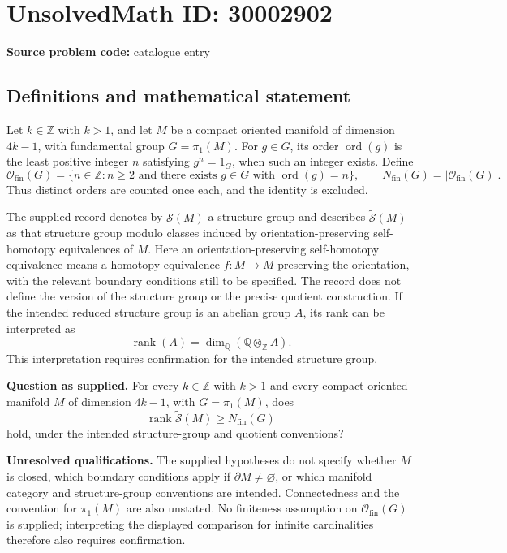\documentclass[11pt]{article}
\newcommand{\Z}{\mathbb{Z}}
\newcommand{\Q}{\mathbb{Q}}
\begin{document}
\section*{UnsolvedMath ID: 30002902}
\textbf{Source problem code:} catalogue entry
\subsection{Definitions and mathematical statement}
Let \(k\in\Z\) with \(k>1\), and let \(M\) be a compact oriented manifold of dimension \(4k-1\), with fundamental group \(G=\pi_1(M)\). For \(g\in G\), its order \(\operatorname{ord}(g)\) is the least positive integer \(n\) satisfying \(g^n=1_G\), when such an integer exists. Define
\[
\mathcal O_{\mathrm{fin}}(G)
 =\{n\in\Z:n\geq 2\text{ and there exists }g\in G\text{ with }\operatorname{ord}(g)=n\},
\qquad
N_{\mathrm{fin}}(G)=\lvert\mathcal O_{\mathrm{fin}}(G)\rvert.
\]
Thus distinct orders are counted once each, and the identity is excluded.

The supplied record denotes by \(\mathcal S(M)\) a structure group and describes \(\widetilde{\mathcal S}(M)\) as that structure group modulo classes induced by orientation-preserving self-homotopy equivalences of \(M\). Here an orientation-preserving self-homotopy equivalence means a homotopy equivalence \(f:M\to M\) preserving the orientation, with the relevant boundary conditions still to be specified. The record does not define the version of the structure group or the precise quotient construction. If the intended reduced structure group is an abelian group \(A\), its rank can be interpreted as
\[
\operatorname{rank}(A)=\dim_{\Q}(\Q\otimes_{\Z}A).
\]
This interpretation requires confirmation for the intended structure group.

\textbf{Question as supplied.} For every \(k\in\Z\) with \(k>1\) and every compact oriented manifold \(M\) of dimension \(4k-1\), with \(G=\pi_1(M)\), does
\[
\operatorname{rank}\widetilde{\mathcal S}(M)\geq N_{\mathrm{fin}}(G)
\]
hold, under the intended structure-group and quotient conventions?

\textbf{Unresolved qualifications.} The supplied hypotheses do not specify whether \(M\) is closed, which boundary conditions apply if \(\partial M\neq\varnothing\), or which manifold category and structure-group conventions are intended. Connectedness and the convention for \(\pi_1(M)\) are also unstated. No finiteness assumption on \(\mathcal O_{\mathrm{fin}}(G)\) is supplied; interpreting the displayed comparison for infinite cardinalities therefore also requires confirmation.
\end{document}
